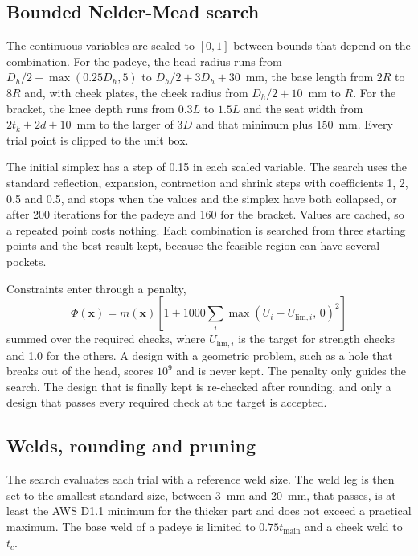 \subsection{Bounded Nelder-Mead search}

The continuous variables are scaled to $[0, 1]$ between bounds that depend on
the combination. For the padeye, the head radius runs from
$D_h/2 + \max(0.25D_h, 5)$ to $D_h/2 + 3D_h + 30$~mm, the base length from
$2R$ to $8R$ and, with cheek plates, the cheek radius from $D_h/2 + 10$~mm to
$R$. For the bracket, the knee depth runs from $0.3L$ to $1.5L$ and the seat
width from $2t_k + 2d + 10$~mm to the larger of $3D$ and that minimum plus
150~mm. Every trial point is clipped to the unit box.

The initial simplex has a step of 0.15 in each scaled variable. The search
uses the standard reflection, expansion, contraction and shrink steps with
coefficients 1, 2, 0.5 and 0.5, and stops when the values and the simplex have
both collapsed, or after 200 iterations for the padeye and 160 for the
bracket. Values are cached, so a repeated point costs nothing. Each
combination is searched from three starting points and the best result kept,
because the feasible region can have several pockets.

Constraints enter through a penalty,
\begin{equation}
\Phi(\mathbf{x}) = m(\mathbf{x})\left[1 + 1000 \sum_i \max(U_i - U_{\text{lim},i},\, 0)^2\right]
\label{eq:penalty}
\end{equation}
summed over the required checks, where $U_{\text{lim},i}$ is the target for
strength checks and 1.0 for the others. A design with a geometric problem,
such as a hole that breaks out of the head, scores $10^9$ and is never kept.
The penalty only guides the search. The design that is finally kept is
re-checked after rounding, and only a design that passes every required check
at the target is accepted.

\subsection{Welds, rounding and pruning}

The search evaluates each trial with a reference weld size. The weld leg is
then set to the smallest standard size, between 3~mm and 20~mm, that passes,
is at least the AWS D1.1 minimum for the thicker part and does not exceed a
practical maximum. The base weld of a padeye is limited to $0.75t_\text{main}$
and a cheek weld to $t_c$.


